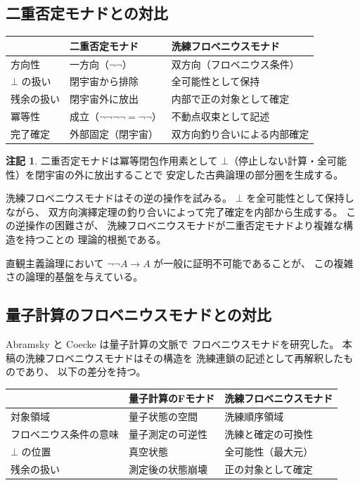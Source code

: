 \documentclass[11pt,a4paper]{article}
\theoremstyle{definition}
\newtheorem{remark}{注記}[section]
\begin{document}
\subsection{二重否定モナドとの対比}

\begin{center}
\begin{tabular}{lll}
\hline
& \textbf{二重否定モナド} & \textbf{洗練フロベニウスモナド} \\
\hline
方向性 & 一方向（$\neg\neg$） & 双方向（フロベニウス条件）\\
$\bot$ の扱い & 閉宇宙から排除 & 全可能性として保持 \\
残余の扱い & 閉宇宙外に放出 & 内部で正の対象として確定 \\
冪等性 & 成立（$\neg\neg\neg\neg = \neg\neg$） & 不動点収束として記述 \\
完了確定 & 外部固定（閉宇宙） & 双方向釣り合いによる内部確定 \\
\hline
\end{tabular}
\end{center}

\begin{remark}
二重否定モナドは冪等閉包作用素として
$\bot$（停止しない計算・全可能性）を閉宇宙の外に放出することで
安定した古典論理の部分圏を生成する。

洗練フロベニウスモナドはその逆の操作を試みる。
$\bot$ を全可能性として保持しながら、
双方向演繹定理の釣り合いによって完了確定を内部から生成する。
この逆操作の困難さが、
洗練フロベニウスモナドが二重否定モナドより複雑な構造を持つことの
理論的根拠である。

直観主義論理において $\neg\neg A \to A$ が一般に証明不可能であることが、
この複雑さの論理的基盤を与えている。
\end{remark}

\subsection{量子計算のフロベニウスモナドとの対比}

Abramsky と Coecke \cite{Abramsky2004} は量子計算の文脈で
フロベニウスモナドを研究した。
本稿の洗練フロベニウスモナドはその構造を
洗練連鎖の記述として再解釈したものであり、
以下の差分を持つ。

\begin{center}
\begin{tabular}{lll}
\hline
& \textbf{量子計算のFモナド} & \textbf{洗練フロベニウスモナド} \\
\hline
対象領域 & 量子状態の空間 & 洗練順序領域 \\
フロベニウス条件の意味 & 量子測定の可逆性 & 洗練と確定の可換性 \\
$\bot$ の位置 & 真空状態 & 全可能性（最大元） \\
残余の扱い & 測定後の状態崩壊 & 正の対象として確定 \\
\hline
\end{tabular}
\end{center}
\end{document}
